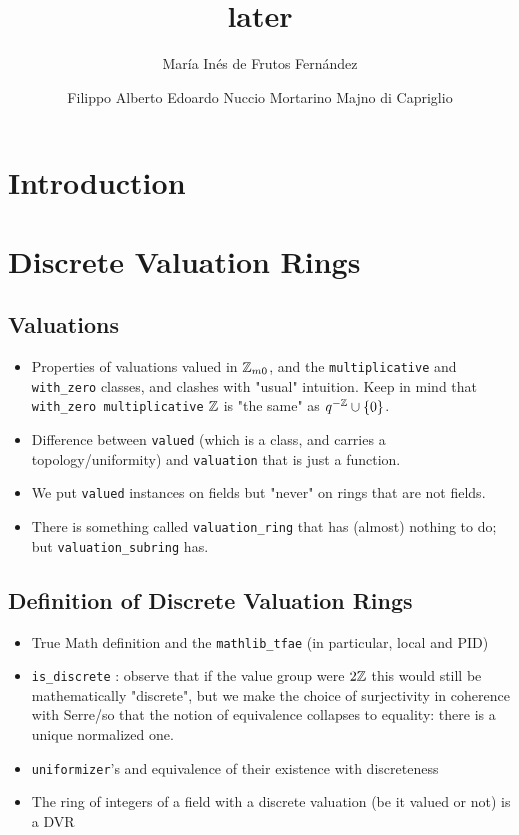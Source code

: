 \documentclass[sigplan,10pt,anonymous,review]{acmart}\settopmatter{printfolios=true,printccs=false,printacmref=false}
\author[M.~I.~de Frutos Fernández]{María Inés de Frutos Fernández}
\author[F.~A.~E.~Nuccio]{Filippo Alberto Edoardo Nuccio Mortarino Majno di Capriglio}
\title{later}
\begin{document}
\maketitle
\section{Introduction}
\section {Discrete Valuation Rings}
\subsection{Valuations}
\begin{itemize}
\item Properties of valuations valued in $\mathbb{Z}_{m0}$, and the \texttt{multiplicative} and \texttt{with\_zero} classes, and clashes with "usual" intuition. Keep in mind that \texttt{with\_zero multiplicative} $\mathbb{Z}$ is "the same" as $q^{-\mathbb{Z}}\cup \{0\}$.
\item Difference between \texttt{valued} (which is a class, and carries a topology/uniformity) and \texttt{valuation} that is just a function.
\item We put \texttt{valued} instances on fields but "never" on rings that are not fields.
\item There is something called \texttt{valuation\_ring} that has (almost) nothing to do; but \texttt{valuation\_subring} has.
\end{itemize}
\subsection{Definition of Discrete Valuation Rings}
\begin{itemize}
\item True Math definition and the \texttt{mathlib\_tfae} (in particular, local and PID)
\item \texttt{is\_discrete} : observe that if the value group were $2\mathbb{Z}$ this would still be mathematically "discrete", but we make the choice of surjectivity in coherence with Serre/so that the notion of equivalence collapses to equality: there is a unique normalized one.
\item \texttt{uniformizer}'s and equivalence of their existence with discreteness
\item The ring of integers of a field with a discrete valuation (be it valued or not) is a DVR
\end{itemize}
\end{document}

